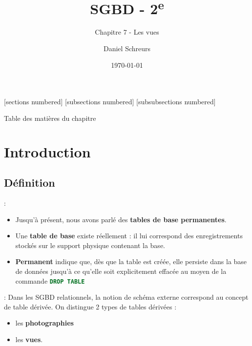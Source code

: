 \documentclass[10pt]{beamer}
\title{SGBD - 2\textsuperscript{e}}
\subtitle{Chapitre 7 - Les vues}
\date{\today}
\author{Daniel Schreurs}
\institute{Haute École de Province de Liège}
\begin{document}
\maketitle

[sections numbered]
[subsections numbered]
[subsubsections numbered]
\begin{frame}[allowframebreaks]{Table des matières du chapitre}
    \tableofcontents[subsectionstyle=show/show/hide,subsubsectionstyle=show/show/hide,]
\end{frame}

\section{Introduction}
\tocss
\subsection{Définition}
\begin{frame}{\secname : \subsecname}
    \begin{itemize}
        \item Jusqu'à présent, nous avons parlé des \textbf{tables de base permanentes}.
        \item Une \textbf{table de base} existe réellement : il lui correspond des enregistrements stockés sur le support physique contenant la base.
        \item \textbf{Permanent} indique que, dès que la table est créée, elle persiste dans la base de données jusqu'à ce qu'elle soit explicitement effacée au moyen de la commande \lstinline[language=sql]!DROP TABLE!
    \end{itemize}
\end{frame}

\begin{frame}{\secname : \subsecname}
    Dans les SGBD relationnels, la notion de schéma externe correspond au concept de table dérivée.  On distingue 2 types de tables dérivées :
    \begin{itemize}
        \item les \textbf{photographies}
        \item les \textbf{vues}.
    \end{itemize}
\end{frame}
\end{document}
